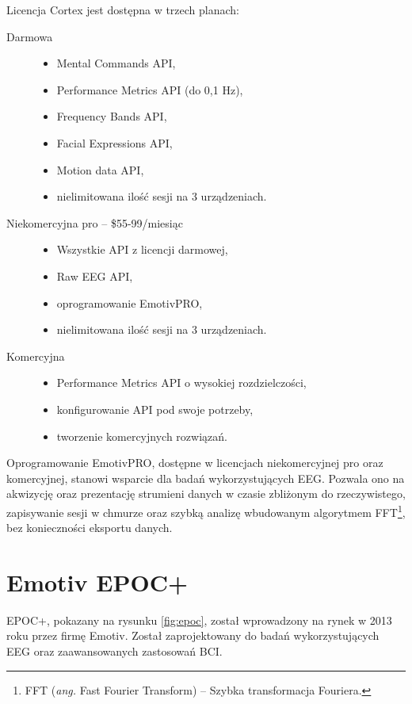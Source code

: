 \documentclass[skorowidz,skroty]{dyplomWEZUT}
\begin{document}
Licencja Cortex jest dostępna w trzech planach:
\begin{description}
    \item [Darmowa] \hfill
    \begin{itemize}
        \item Mental Commands API,
        \item Performance Metrics API (do 0,1 Hz),
        \item Frequency Bands API,
        \item Facial Expressions API,
        \item Motion data API,
        \item nielimitowana ilość sesji na 3 urządzeniach.
    \end{itemize}
    \item [Niekomercyjna pro -- \$55-99/miesiąc] \hfill
    \begin{itemize}
        \item Wszystkie API z licencji darmowej,
        \item Raw EEG API,
        \item oprogramowanie EmotivPRO,
        \item nielimitowana ilość sesji na 3 urządzeniach.
    \end{itemize}
    \item [Komercyjna] \hfill
    \begin{itemize}
        \item Performance Metrics API o wysokiej rozdzielczości,
        \item konfigurowanie API pod swoje potrzeby,
        \item tworzenie komercyjnych rozwiązań.
    \end{itemize}
\end{description}

Oprogramowanie EmotivPRO\cite{emotiv_pro}, dostępne w licencjach niekomercyjnej pro oraz komercyjnej, stanowi wsparcie dla badań wykorzystujących EEG. Pozwala ono na akwizycję oraz prezentację strumieni danych w czasie zbliżonym do rzeczywistego, zapisywanie sesji w chmurze oraz szybką analizę wbudowanym algorytmem FFT\footnote{FFT (\textit{ang.} Fast Fourier Transform) -- Szybka transformacja Fouriera.}, bez konieczności eksportu danych.


\section{Emotiv EPOC+\label{section:epoc}}
EPOC+, pokazany na rysunku \vref{fig:epoc}, został wprowadzony na rynek w 2013 roku przez firmę Emotiv. Został zaprojektowany do badań wykorzystujących EEG oraz zaawansowanych zastosowań BCI\cite{emotiv_epoc}.
\end{document}
